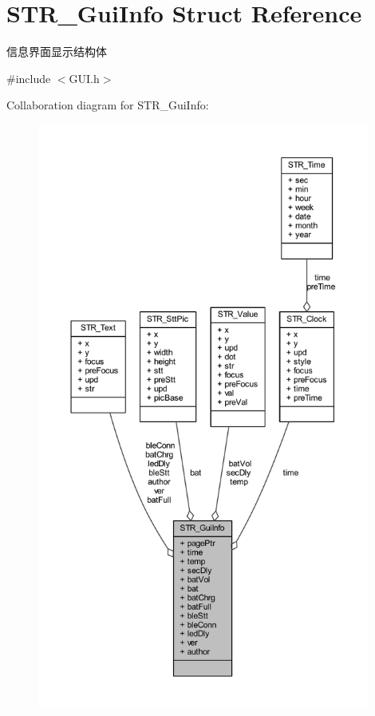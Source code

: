 \hypertarget{struct_s_t_r___gui_info}{\section{\-S\-T\-R\-\_\-\-Gui\-Info \-Struct \-Reference}
\label{struct_s_t_r___gui_info}
}


信息界面显示结构体  




{\ttfamily \#include $<$\-G\-U\-I.\-h$>$}



\-Collaboration diagram for \-S\-T\-R\-\_\-\-Gui\-Info\-:\nopagebreak
\begin{figure}[H]
\begin{center}
\leavevmode
\includegraphics[height=550pt]{struct_s_t_r___gui_info__coll__graph}
\end{center}
\end{figure}
